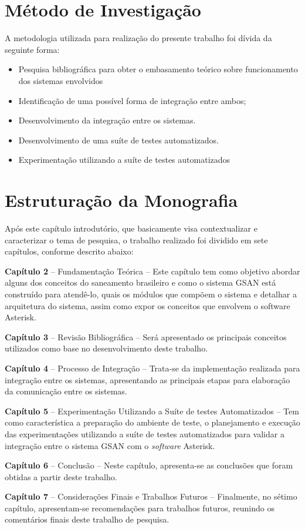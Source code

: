 \section*{Método de Investigação}
A metodologia utilizada para realização do presente trabalho foi dívida da seguinte forma:
\begin{itemize}
	\item Pesquisa bibliográfica para obter o embasamento teórico sobre funcionamento dos sistemas envolvidos
	\item Identificação de uma possível forma de integração entre ambos;
	\item Desenvolvimento da integração entre os sistemas.
	\item Desenvolvimento de uma suíte de testes automatizados.
	\item Experimentação utilizando a suíte de testes automatizados
\end{itemize}

\section*{Estruturação da Monografia}
	
Após este capítulo introdutório, que basicamente visa contextualizar e caracterizar o tema de pesquisa, o trabalho realizado foi dividido em sete capítulos, conforme descrito abaixo:
\begin{description}
	\item \textbf{Capítulo 2} – Fundamentação Teórica – Este capítulo tem como objetivo abordar alguns dos conceitos do saneamento brasileiro e como o sistema GSAN está construído para atendê-lo, quais os módulos que compõem o sistema e detalhar a arquitetura do sistema, assim como expor os conceitos que envolvem o software Asterisk.
	\item \textbf{Capítulo 3 } – Revisão Bibliográfica – Será apresentado os principais conceitos utilizados como base no desenvolvimento deste trabalho.
	\item \textbf{Capítulo  4} – Processo de Integração – Trata-se da implementação realizada para integração entre os sistemas, apresentando as principais etapas para elaboração da comunicação entre os sistemas.
	\item \textbf{Capítulo  5} – Experimentação Utilizando a Suíte de testes Automatizados – Tem como característica a preparação do ambiente de teste, o planejamento e execução das experimentações utilizando a suíte de testes automatizados para validar a integração entre o sistema GSAN com o \textit{software} Asterisk.
	\item \textbf{Capítulo 6} – Conclusão – Neste capítulo, apresenta-se as conclusões que foram obtidas a partir deste trabalho.
	\item \textbf{Capítulo 7} – Considerações Finais e Trabalhos Futuros – Finalmente, no sétimo capítulo, apresentam-se recomendações para trabalhos futuros, reunindo os comentários finais deste trabalho de pesquisa.	
\end{description}
	

